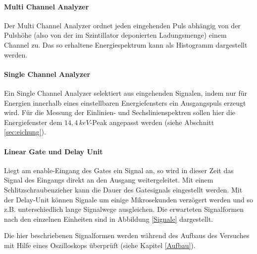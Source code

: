 \paragraph{Multi Channel Analyzer}
Der Multi Channel Analyzer ordnet jeden eingehenden Puls abhängig von der Pulshöhe (also von der im Szintillator deponierten Ladungsmenge) einem Channel zu. Das so erhaltene Energiespektrum kann als Histogramm dargestellt werden.
\paragraph{Single Channel Analyzer}
Ein Single Channel Analyzer selektiert aus eingehenden Signalen, indem nur für Energien innerhalb eines einstellbaren Energiefensters ein Ausgangspuls erzeugt wird. Für die Messung der Einlinien- und Sechslinienspektren sollen hier die Energiefenster dem $14,4\,\si{keV}$-Peak angepasst werden (siehe Abschnitt \ref{sec:eichung}).
\paragraph{Linear Gate und Delay Unit}
Liegt am enable-Eingang des Gates ein Signal an, so wird in dieser Zeit das Signal des
Eingangs direkt an den Ausgang weitergeleitet. Mit einem Schlitzschraubenzieher kann
die Dauer des Gatesignals eingestellt werden. Mit der Delay-Unit können Signale um einige Mikrosekunden verzögert werden und so z.B. unterschiedlich lange Signalwege ausgleichen.
Die erwarteten Signalformen nach den einzelnen Einheiten sind in Abbildung \ref{Signale}    dargestellt.

Die hier beschriebenen Signalformen werden während des Aufbaus des Versuches mit Hilfe eines Oszilloskops überprüft (siehe Kapitel \ref{Aufbau}).



